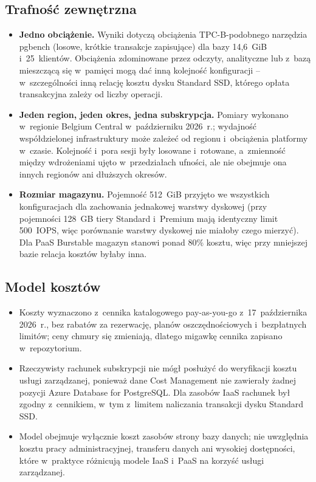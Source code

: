 \subsection*{Trafność zewnętrzna}

\begin{itemize}
  \item \textbf{Jedno obciążenie.} Wyniki dotyczą obciążenia TPC-B-podobnego narzędzia pgbench
  (losowe, krótkie transakcje zapisujące) dla bazy 14,6~GiB i~25~klientów. Obciążenia
  zdominowane przez odczyty, analityczne lub z~bazą mieszczącą się w~pamięci mogą dać inną
  kolejność konfiguracji -- w~szczególności inną relację kosztu dysku Standard SSD, którego
  opłata transakcyjna zależy od liczby operacji.
  \item \textbf{Jeden region, jeden okres, jedna subskrypcja.} Pomiary wykonano w~regionie
  Belgium Central w~październiku 2026~r.; wydajność współdzielonej infrastruktury może
  zależeć od regionu i~obciążenia platformy w~czasie. Kolejność i~pora sesji były losowane
  i~rotowane, a~zmienność między wdrożeniami ujęto w~przedziałach ufności, ale nie obejmuje
  ona innych regionów ani dłuższych okresów.
  \item \textbf{Rozmiar magazynu.} Pojemność 512~GiB przyjęto we wszystkich konfiguracjach dla
  zachowania jednakowej warstwy dyskowej (przy pojemności 128~GB tiery Standard i~Premium
  mają identyczny limit 500~IOPS, więc porównanie warstwy dyskowej nie miałoby czego mierzyć). Dla PaaS Burstable magazyn stanowi ponad 80\% kosztu, więc
  przy mniejszej bazie relacja kosztów byłaby inna.
\end{itemize}

\subsection*{Model kosztów}

\begin{itemize}
  \item Koszty wyznaczono z~cennika katalogowego pay-as-you-go z~17~października 2026~r.,
  bez rabatów za rezerwację, planów oszczędnościowych i~bezpłatnych limitów; ceny chmury się
  zmieniają, dlatego migawkę cennika zapisano w~repozytorium.
  \item Rzeczywisty rachunek subskrypcji nie mógł posłużyć do weryfikacji kosztu usługi
  zarządzanej, ponieważ dane Cost Management nie zawierały żadnej pozycji Azure Database for
  PostgreSQL. Dla zasobów IaaS rachunek był zgodny z~cennikiem, w~tym z~limitem naliczania
  transakcji dysku Standard SSD.
  \item Model obejmuje wyłącznie koszt zasobów strony bazy danych; nie uwzględnia kosztu pracy
  administracyjnej, transferu danych ani wysokiej dostępności, które w~praktyce różnicują
  modele IaaS i~PaaS na korzyść usługi zarządzanej.
\end{itemize}

